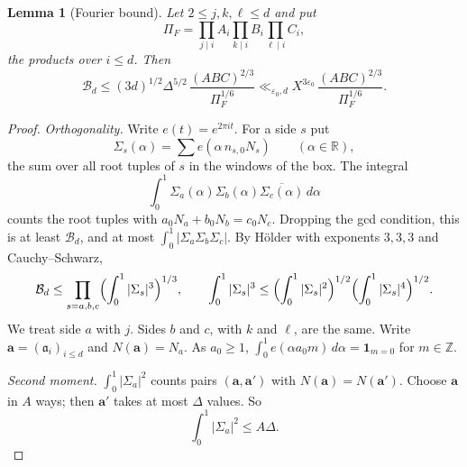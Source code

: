 \documentclass{amsart}
\newtheorem{lemma}{Lemma}[section]
\theoremstyle{definition}
\theoremstyle{plain}
\numberwithin{equation}{section}
\numberwithin{table}{section}
\newcommand{\Z}{\mathbb{Z}}
\begin{document}
\begin{lemma}[Fourier bound]\label{lem:app:fourier}
Let $2\le j,k,\ell\le d$ and put
\[
 \Pi_F=\prod_{j\mid i}A_i\prod_{k\mid i}B_i\prod_{\ell\mid i}C_i,
\]
the products over $i\le d$. Then
\[
 \mathcal B_d\le(3d)^{1/2}\Delta^{5/2}\,\frac{(ABC)^{2/3}}{\Pi_F^{1/6}}
 \ll_{\varepsilon_0,d}X^{3\varepsilon_0}\,\frac{(ABC)^{2/3}}{\Pi_F^{1/6}} .
\]
\end{lemma}

\begin{proof}
\emph{Orthogonality.} Write $e(t)=e^{2\pi it}$. For a side $s$ put
\[
 \Sigma_s(\alpha)=\sum e(\alpha\,n_{s,0}N_s)\qquad(\alpha\in\mathbb R),
\]
the sum over all root tuples of $s$ in the windows of the box. The integral
\[
 \int_0^1\Sigma_a(\alpha)\Sigma_b(\alpha)\overline{\Sigma_c(\alpha)}\,d\alpha
\]
counts the root tuples with $a_0N_a+b_0N_b=c_0N_c$. Dropping the gcd
condition, this is at least $\mathcal B_d$, and at most
$\int_0^1|\Sigma_a\Sigma_b\Sigma_c|$. By H\"older with exponents
$3,3,3$ and Cauchy--Schwarz,
\begin{equation}\label{eq:app:holder}
 \mathcal B_d\le\prod_{s=a,b,c}\Bigl(\int_0^1|\Sigma_s|^3\Bigr)^{1/3},
 \qquad
 \int_0^1|\Sigma_s|^3\le\Bigl(\int_0^1|\Sigma_s|^2\Bigr)^{1/2}
 \Bigl(\int_0^1|\Sigma_s|^4\Bigr)^{1/2}.
\end{equation}
We treat side $a$ with $j$. Sides $b$ and $c$, with $k$ and $\ell$, are the
same. Write $\mathbf a=(\mathfrak a_i)_{i\le d}$ and $N(\mathbf a)=N_a$.
As $a_0\ge1$, $\int_0^1e(\alpha a_0m)\,d\alpha=\mathbf 1_{m=0}$ for $m\in\Z$.

\emph{Second moment.} $\int_0^1|\Sigma_a|^2$ counts pairs
$(\mathbf a,\mathbf a')$ with $N(\mathbf a)=N(\mathbf a')$. Choose
$\mathbf a$ in $A$ ways; then $\mathbf a'$ takes at most $\Delta$ values. So
\[
 \int_0^1|\Sigma_a|^2\le A\Delta .
\]


\end{proof}
\end{document}
